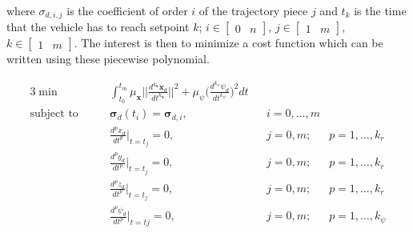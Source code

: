 \noindent where $\sigma_{d,i,j}$ is the coefficient of order $i$ of the trajectory piece $j$ and $t_k$ is the time that the vehicle has to reach setpoint $k$; $i \in \begin{bmatrix}0 & n\end{bmatrix}$, $j \in \begin{bmatrix}1 & m\end{bmatrix}$, $k \in \begin{bmatrix}1 & m\end{bmatrix}$. The interest is then to minimize a cost function which can be written using these piecewise polynomial.

\begin{alignat}{3}
	\min\qquad & \int_{t_0}^{t_m}\mu_{\mathbf{x}} \Bigg|\Bigg|\frac{d^{k_{\mathbf{x}}}\mathbf{x}_d}{dt^{k_{\mathbf{x}}}} \Bigg|\Bigg|^2 + \mu_{\psi}\Bigg(\frac{d^{k_{\psi}}\psi_d}{dt^{k_{\psi}}}\Bigg)^2dt \\
	\text{subject to}\qquad & \boldsymbol{\sigma}_d(t_i) = \boldsymbol{\sigma}_{d,i}, && i=0,\dots ,m \nonumber \\
	& \frac{d^px_d}{dt^p}\Big|_{t=t_j}=0, && j=0,m; & p=1,\dots ,k_r \nonumber \\
	& \frac{d^py_d}{dt^p}\Big|_{t=t_j}=0, && j=0,m; & p=1,\dots ,k_r \nonumber \\
	& \frac{d^pz_d}{dt^p}\Big|_{t=t_j}=0, && j=0,m; & p=1,\dots ,k_r \nonumber \\
	& \frac{d^p\psi_d}{dt^p}\Big|_{t=tj}=0, && j=0,m; & p=1,\dots ,k_{\psi} \nonumber
	\label{eq:minimizationCost}
\end{alignat}

